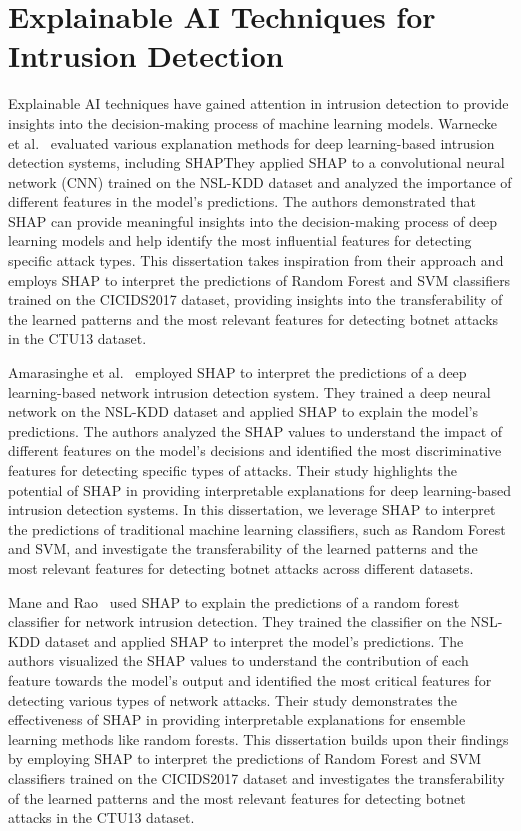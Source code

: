 \section{Explainable AI Techniques for Intrusion Detection}

Explainable AI techniques have gained attention in intrusion detection to provide insights into the decision-making process of machine learning models. Warnecke et al.~\cite{warnecke2020evaluating} evaluated various explanation methods for deep learning-based intrusion detection systems, including SHAP\@ They applied SHAP to a convolutional neural network (CNN) trained on the NSL-KDD dataset and analyzed the importance of different features in the model's predictions. The authors demonstrated that SHAP can provide meaningful insights into the decision-making process of deep learning models and help identify the most influential features for detecting specific attack types. This dissertation takes inspiration from their approach and employs SHAP to interpret the predictions of Random Forest and SVM classifiers trained on the CICIDS2017 dataset, providing insights into the transferability of the learned patterns and the most relevant features for detecting botnet attacks in the CTU13 dataset.

Amarasinghe et al.~\cite{amarasinghe2018toward} employed SHAP to interpret the predictions of a deep learning-based network intrusion detection system. They trained a deep neural network on the NSL-KDD dataset and applied SHAP to explain the model's predictions. The authors analyzed the SHAP values to understand the impact of different features on the model's decisions and identified the most discriminative features for detecting specific types of attacks. Their study highlights the potential of SHAP in providing interpretable explanations for deep learning-based intrusion detection systems. In this dissertation, we leverage SHAP to interpret the predictions of traditional machine learning classifiers, such as Random Forest and SVM, and investigate the transferability of the learned patterns and the most relevant features for detecting botnet attacks across different datasets.

Mane and Rao~\cite{mane2021explaining} used SHAP to explain the predictions of a random forest classifier for network intrusion detection. They trained the classifier on the NSL-KDD dataset and applied SHAP to interpret the model's predictions. The authors visualized the SHAP values to understand the contribution of each feature towards the model's output and identified the most critical features for detecting various types of network attacks. Their study demonstrates the effectiveness of SHAP in providing interpretable explanations for ensemble learning methods like random forests. This dissertation builds upon their findings by employing SHAP to interpret the predictions of Random Forest and SVM classifiers trained on the CICIDS2017 dataset and investigates the transferability of the learned patterns and the most relevant features for detecting botnet attacks in the CTU13 dataset.


